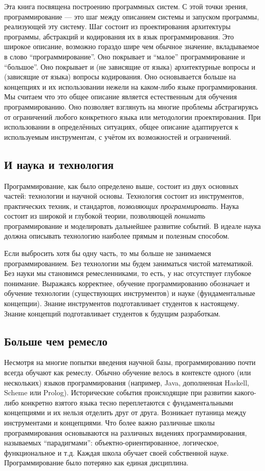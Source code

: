 Эта книга посвящена построению программных систем. С этой точки зрения, программирование --- это шаг между описанием системы и запуском программы, реализующей эту систему. Шаг состоит из проектирования архитектуры программы, абстракций и кодирования их в язык программирования. Это широкое описание, возможно гораздо шире чем обычное значение, вкладываемое в слово ``программирование''. Оно покрывает и ``малое'' программирование и ``большое''. Оно покрывает и (не зависящие от языка) архитектурные вопросы и (зависящие от языка) вопросы кодирования. Оно основывается больше на концепциях и их использовании нежели на каком-либо языке программирования. Мы считаем что это общее описание является естественным для обучения программированию. Оно позволяет взглянуть на многие проблемы абстрагируясь от ограничений любого конкретного языка или методологии проектирования. При использовании в определённых ситуациях, общее описание адаптируется к используемым инструментам, с учётом их возможностей и ограничений.

\subsection*{И наука и технология}

Программирование, как было определено выше, состоит из двух основных частей: технологии и научной основы. Технология состоит из инструментов, практических техник, и стандартов, \emph{позволяющих программировать}. Наука состоит из широкой и глубокой теории, позволяющей \emph{понимать} программирование и моделировать дальнейшее развитие событий. В идеале наука должна описывать технологию наиболее прямым и полезным способом.

Если выбросить хотя бы одну часть, то мы больше не занимаемся программированием. Без технологии мы будем заниматься чистой математикой. Без науки мы становимся ремесленниками, то есть, у нас отсутствует глубокое понимание. Выражаясь корректнее, обучение программированию обозначает и обучение технологии (существующих инструментов) и науке (фундаментальные концепции). Знание инструментов подготавливает студентов к настоящему. Знание концепций подготавливает студентов к будущим разработкам.

\subsection*{Больше чем ремесло}

Несмотря на многие попытки введения научной базы, программированию почти всегда обучают как ремеслу. Обычно обучение велось в контексте одного (или нескольких) языков программирования (например, Java, дополненная Haskell, Scheme или Prolog). Исторические события происходящие при развитии какого-либо конкретно взятого языка тесно переплетаются с фундаментальными концепциями и их нельзя отделить друг от друга. Возникает путаница между инструментами и концепциями. Что более важно различные школы программирования основываются на различных видениях программирования, называемых ``парадигмами'': объектно-ориентированное, логическое, функциональное и т.д. Каждая школа обучает своей собственной науке. Программирование было потеряно как единая дисциплина.

